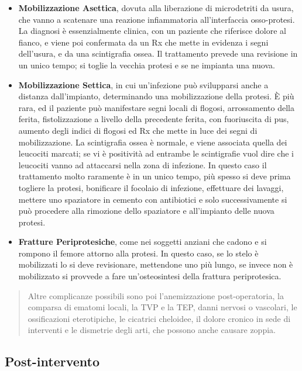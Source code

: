 \begin{itemize}
\item
  \textbf{Mobilizzazione Asettica}, dovuta alla liberazione di
  microdetriti da usura, che vanno a scatenare una reazione
  infiammatoria all'interfaccia osso-protesi. La diagnosi è
  essenzialmente clinica, con un paziente che riferisce dolore al
  fianco, e viene poi confermata da un Rx che mette in evidenza i segni
  dell'usura, e da una scintigrafia ossea. Il trattamento prevede una
  revisione in un unico tempo; si toglie la vecchia protesi e se ne
  impianta una nuova.
\item
  \textbf{Mobilizzazione Settica}, in cui un'infezione può svilupparsi
  anche a distanza dall'impianto, determinando una mobilizzazione della
  protesi. È più rara, ed il paziente può manifestare segni locali di
  flogosi, arrossamento della ferita, fistolizzazione a livello della
  precedente ferita, con fuoriuscita di pus, aumento degli indici di
  flogosi ed Rx che mette in luce dei segni di mobilizzazione. La
  scintigrafia ossea è normale, e viene associata quella dei leucociti
  marcati; se vi è positività ad entrambe le scintigrafie vuol dire che
  i leucociti vanno ad attaccarsi nella zona di infezione. In questo
  caso il trattamento molto raramente è in un unico tempo, più spesso si
  deve prima togliere la protesi, bonificare il focolaio di infezione,
  effettuare dei lavaggi, mettere uno spaziatore in cemento con
  antibiotici e solo successivamente si può procedere alla rimozione
  dello spaziatore e all'impianto delle nuova protesi.
\item
  \textbf{Fratture Periprotesiche}, come nei soggetti anziani che cadono
  e si rompono il femore attorno alla protesi. In questo caso, se lo
  stelo è mobilizzati lo si deve revisionare, mettendone uno più lungo,
  se invece non è mobilizzato si provvede a fare un'osteosintesi della
  frattura periprotesica.
\end{itemize}

\begin{quote}
Altre complicanze possibili sono poi l'anemizzazione post-operatoria, la
comparsa di ematomi locali, la TVP e la TEP, danni nervosi o vascolari,
le ossificazioni eterotipiche, le cicatrici cheloidee, il dolore cronico
in sede di interventi e le dismetrie degli arti, che possono anche
causare zoppia.
\end{quote}

\subsection{Post-intervento}



